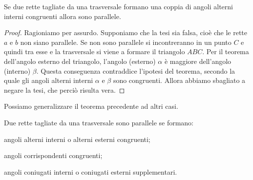 \begin{inaccessibleblock}
    \begin{center}\end{center}
\end{inaccessibleblock}

\begin{teorema}
  Se due rette tagliate da una trasversale formano una coppia di angoli 
  alterni interni congruenti allora sono parallele.
\end{teorema}

\begin{minipage}{.49\textwidth}
\begin{proof}
  Ragioniamo per assurdo. Supponiamo che la tesi sia falsa, cioè che le 
  rette \(a\) e \(b\) non siano parallele. Se non sono parallele si 
  incontreranno in un punto \(C\) e quindi tra esse e la trasversale si 
  viene a formare il triangolo \(ABC\). Per il teorema dell'angolo 
  esterno del triangolo, l'angolo (esterno) \(\alpha\) è maggiore 
  dell'angolo (interno) \(\beta\). Questa conseguenza contraddice 
  l'ipotesi del teorema, secondo la quale gli angoli alterni interni 
  \(\alpha\) e \(\beta\) sono congruenti. Allora abbiamo sbagliato a negare 
  la tesi, che perciò risulta vera.
\end{proof}
\end{minipage}
\begin{minipage}{.49\textwidth}
\begin{inaccessibleblock}
    \centering
\end{inaccessibleblock}
\end{minipage}


Possiamo generalizzare il teorema precedente ad altri casi.
\begin{teorema}
  Due rette tagliate da una trasversale sono parallele se formano:
  \begin{itemize*}
    \item angoli alterni interni o alterni esterni congruenti;
    \item angoli corrispondenti congruenti;
    \item angoli coniugati interni o coniugati esterni supplementari.
  \end{itemize*}
\end{teorema}

